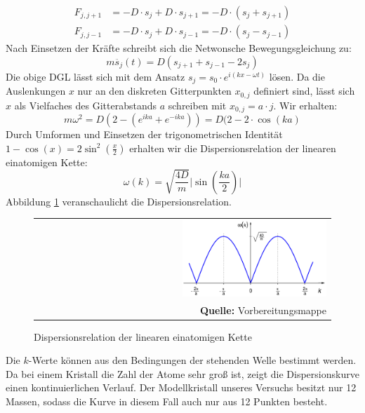 \documentclass[a4paper,titlepage]{scrartcl}
\numberwithin{equation}{section}
\begin{document}
\begin{align*}
F_{j,j+1}&=-D \cdot s_j + D \cdot s_{j+1}=-D \cdot (s_j + s_{j + 1})\\
F_{j,j-1}&=-D \cdot s_j + D \cdot s_{j-1}=-D \cdot (s_j - s_{j - 1})
\end{align*}
Nach Einsetzen der Kräfte schreibt sich die Netwonsche Bewegungsgleichung zu:
\begin{equation*}
m\ddot{s_j}(t)=D(s_{j+1} + s_{j-1} - 2 s_j)
\end{equation*}
Die obige DGL lässt sich mit dem Ansatz $s_j=s_0 \cdot e^{i(kx-\omega t)}$ lösen. Da die Auslenkungen $x$ nur an den diskreten Gitterpunkten $x_{0,j}$ definiert sind, lässt sich $x$ als Vielfaches des Gitterabstands $a$ schreiben mit $x_{0,j}=a \cdot j$. Wir erhalten:
\begin{equation*}
m \omega^2=D(2-(e^{ika}+e^{-ika}))=D(2-2 \cdot \cos{(ka)}
\end{equation*}
Durch Umformen und Einsetzen der trigonometrischen Identität $1-\cos{(x)}=2\sin^2{(\frac{x}{2})}$ erhalten wir die Dispersionsrelation der linearen einatomigen Kette:
\begin{equation}
\omega(k)=\sqrt{\frac{4D}{m}}\bigg|\sin{\left(\frac{ka}{2}\right)}\bigg|
\label{eq:dispersionsrelationeinatom}
\end{equation}
Abbildung \ref{fig:einatomkettedispersion} veranschaulicht die Dispersionsrelation.
\begin{figure}[H]
	\centering
	\begin{tabular}{@{}r@{}}
		\includegraphics[width=0.5\textwidth]{einatomkettedispersion.png}\\
		\footnotesize\sffamily\textbf{Quelle:} Vorbereitungsmappe \cite{vorbereitungsmappe}
	\end{tabular}
	\caption{Dispersionsrelation der linearen einatomigen Kette}
    \label{fig:einatomkettedispersion}
\end{figure}
Die $k$-Werte können aus den Bedingungen der stehenden Welle bestimmt werden. Da bei einem Kristall die Zahl der Atome sehr groß ist, zeigt die Dispersionskurve einen kontinuierlichen Verlauf. Der Modellkristall unseres Versuchs besitzt nur  12 Massen, sodass die Kurve in diesem Fall auch nur aus 12 Punkten besteht.\\ \\
\end{document}
